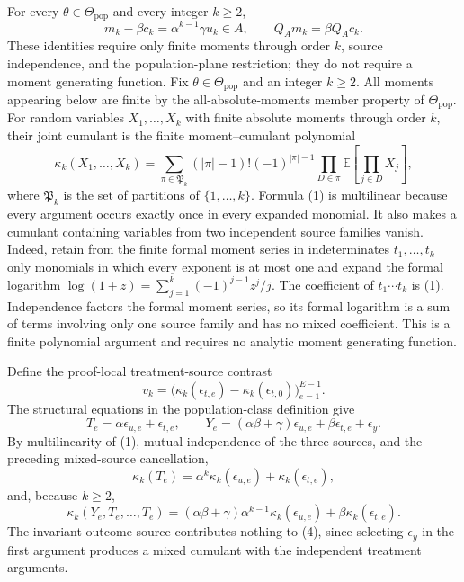 For every \(\theta\in\Theta_{\mathrm{pop}}\) and every integer \(k\geq2\),
\[
 m_k-\beta c_k=\alpha^{k-1}\gamma u_k\in A,
 \qquad Q_Am_k=\beta Q_Ac_k.
\]
These identities require only finite moments through order \(k\), source independence, and the population-plane restriction; they do not require a moment generating function.
Fix \(\theta\in\Theta_{\mathrm{pop}}\) and an integer \(k\geq2\).  All moments appearing below are finite by the all-absolute-moments member property of \(\Theta_{\mathrm{pop}}\).  For random variables \(X_1,\ldots,X_k\) with finite absolute moments through order \(k\), their joint cumulant is the finite moment--cumulant polynomial
\[
 \kappa_k(X_1,\ldots,X_k)
 =\sum_{\pi\in\mathfrak P_k}(|\pi|-1)!(-1)^{|\pi|-1}
   \prod_{D\in\pi}\mathbb E\!\left[\prod_{j\in D}X_j\right],             \tag{1}
\]
where \(\mathfrak P_k\) is the set of partitions of \(\{1,\ldots,k\}\).  Formula (1) is multilinear because every argument occurs exactly once in every expanded monomial.  It also makes a cumulant containing variables from two independent source families vanish.  Indeed, retain from the finite formal moment series in indeterminates \(t_1,\ldots,t_k\) only monomials in which every exponent is at most one and expand the formal logarithm \(\log(1+z)=\sum_{j=1}^k(-1)^{j-1}z^j/j\).  The coefficient of \(t_1\cdots t_k\) is (1).  Independence factors the formal moment series, so its formal logarithm is a sum of terms involving only one source family and has no mixed coefficient.  This is a finite polynomial argument and requires no analytic moment generating function.

Define the proof-local treatment-source contrast
\[
 v_k=\bigl(\kappa_k(\epsilon_{t,e})-
                 \kappa_k(\epsilon_{t,0})\bigr)_{e=1}^{E-1}.
\]
The structural equations in the population-class definition give
\[
 T_e=\alpha\epsilon_{u,e}+\epsilon_{t,e},
 \qquad
 Y_e=(\alpha\beta+\gamma)\epsilon_{u,e}
       +\beta\epsilon_{t,e}+\epsilon_y.                                  \tag{2}
\]
By multilinearity of (1), mutual independence of the three sources, and the preceding mixed-source cancellation,
\[
 \kappa_k(T_e)=\alpha^k\kappa_k(\epsilon_{u,e})
                  +\kappa_k(\epsilon_{t,e}),                              \tag{3}
\]
and, because \(k\geq2\),
\[
 \kappa_k(Y_e,T_e,\ldots,T_e)
 =(\alpha\beta+\gamma)\alpha^{k-1}\kappa_k(\epsilon_{u,e})
   +\beta\kappa_k(\epsilon_{t,e}).                                       \tag{4}
\]
The invariant outcome source contributes nothing to (4), since selecting \(\epsilon_y\) in the first argument produces a mixed cumulant with the independent treatment arguments.

